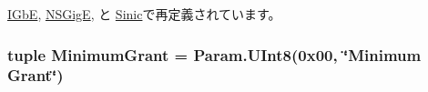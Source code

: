\hyperlink{classEthernet_1_1IGbE_a10460b79882894b983aca9f848f4ffaf}{IGbE}, \hyperlink{classEthernet_1_1NSGigE_a10460b79882894b983aca9f848f4ffaf}{NSGigE}, と \hyperlink{classEthernet_1_1Sinic_a10460b79882894b983aca9f848f4ffaf}{Sinic}で再定義されています。\hypertarget{classPci_1_1PciDevice_a00f14447f8246b8b6a86c550185caddc}{
\subsubsection[{MinimumGrant}]{\setlength{\rightskip}{0pt plus 5cm}tuple {\bf MinimumGrant} = Param.UInt8(0x00, \char`\"{}Minimum Grant\char`\"{})}}
\label{classPci_1_1PciDevice_a00f14447f8246b8b6a86c550185caddc}


